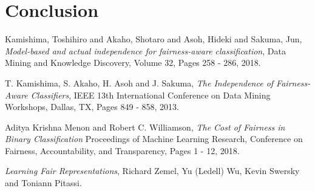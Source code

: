 \documentclass[a4paper, 12pt, titlepage]{article}
\begin{document}
\section*{Conclusion}

\begin{thebibliography}{10}







  Kamishima, Toshihiro and Akaho, Shotaro and Asoh, Hideki and Sakuma, Jun,
  \textit{Model-based and actual independence for fairness-aware classification},
  Data Mining and Knowledge Discovery,
  Volume 32,
  Pages 258 - 286,
  2018.

  T. Kamishima, S. Akaho, H. Asoh and J. Sakuma, 
  \textit{The Independence of Fairness-Aware Classifiers},
  IEEE 13th International Conference on Data Mining Workshops, Dallas, TX,
  Pages 849 - 858,
  2013.

  Aditya Krishna Menon and Robert C. Williamson,
  \textit{The Cost of Fairness in Binary Classification}
  Proceedings of Machine Learning Research,
  Conference on Fairness, Accountability, and Transparency,
  Pages 1 - 12,
  2018.

  \textit{Learning Fair Representations},
  Richard Zemel, Yu (Ledell) Wu, Kevin Swersky and Toniann Pitassi.

  
\end{thebibliography}
\end{document}
